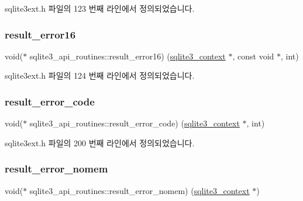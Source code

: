 sqlite3ext.\+h 파일의 123 번째 라인에서 정의되었습니다.

\mbox{\label{structsqlite3__api__routines_aa5c6ea660625078a1256a548d8e746ba}} 
\subsubsection{\texorpdfstring{result\+\_\+error16}{result\_error16}}
{\footnotesize\ttfamily void($\ast$ sqlite3\+\_\+api\+\_\+routines\+::result\+\_\+error16) (\hyperlink{sqlite3_8h_a3b519553ffec8fc42b2356f5b1ebdc57}{sqlite3\+\_\+context} $\ast$, const void $\ast$, int)}



sqlite3ext.\+h 파일의 124 번째 라인에서 정의되었습니다.

\mbox{\label{structsqlite3__api__routines_aef0ea817c076999387222eb34cba23ba}} 
\subsubsection{\texorpdfstring{result\+\_\+error\+\_\+code}{result\_error\_code}}
{\footnotesize\ttfamily void($\ast$ sqlite3\+\_\+api\+\_\+routines\+::result\+\_\+error\+\_\+code) (\hyperlink{sqlite3_8h_a3b519553ffec8fc42b2356f5b1ebdc57}{sqlite3\+\_\+context} $\ast$, int)}



sqlite3ext.\+h 파일의 200 번째 라인에서 정의되었습니다.

\mbox{\label{structsqlite3__api__routines_a51e4c10c9ad6aa8b2925cac3b07db982}} 
\subsubsection{\texorpdfstring{result\+\_\+error\+\_\+nomem}{result\_error\_nomem}}
{\footnotesize\ttfamily void($\ast$ sqlite3\+\_\+api\+\_\+routines\+::result\+\_\+error\+\_\+nomem) (\hyperlink{sqlite3_8h_a3b519553ffec8fc42b2356f5b1ebdc57}{sqlite3\+\_\+context} $\ast$)}



